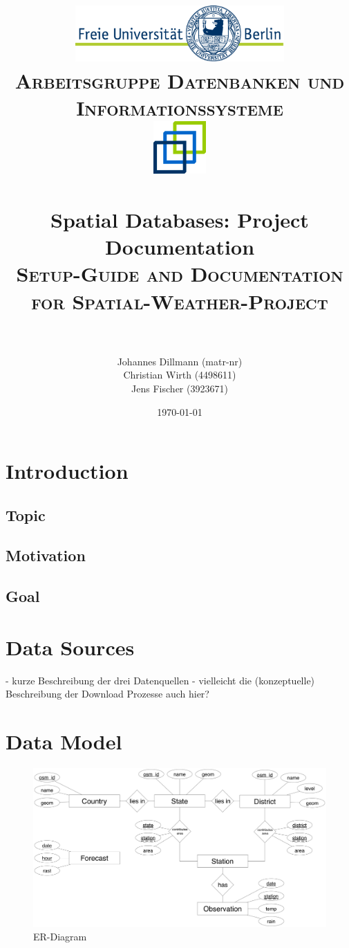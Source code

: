 \documentclass[paper=a4, fontsize=11pt]{scrartcl} %
\title{	
\normalfont \normalsize 
\textsc{\includegraphics[width=0.6\textwidth]{pictures/logo} \\ [5pt] Arbeitsgruppe Datenbanken und Informationssysteme \\ [20pt] \includegraphics[width=0.15\textwidth]{pictures/DBIS_Logo_rgb_web.png}} \\ [10pt] %
\horrule{0.5pt} \\[0.4cm] %
\huge Spatial Databases: Project Documentation \\ %
\normalsize \textsc{Setup-Guide and Documentation for Spatial-Weather-Project} \\ [0.4cm]
\horrule{2pt} \\[0.5cm] %
}
\author{Johannes Dillmann (matr-nr) \\ Christian Wirth (4498611) \\ Jens Fischer (3923671)}
\date{\normalsize\today} %
\numberwithin{equation}{section} %
\numberwithin{figure}{section} %
\numberwithin{table}{section} %
\begin{document}
\begin{titlepage}
\maketitle
\thispagestyle{empty}
\end{titlepage}

\newpage
\setcounter{page}{1}
\tableofcontents

\newpage
\listoffigures
{}

\newpage
{}
\pagestyle{fancy}
\setcounter{page}{1}

\section{Introduction}
	\subsection{Topic}
	\subsection{Motivation}
	\subsection{Goal}
\section{Data Sources}
	- kurze Beschreibung der drei Datenquellen
	- vielleicht die (konzeptuelle) Beschreibung der Download Prozesse auch hier?
	
\section{Data Model}
\begin{figure}[htbp]
\includegraphics[width=1\textwidth]{pictures/ER}
\caption{ER-Diagram}
\end{figure}
\end{document}
